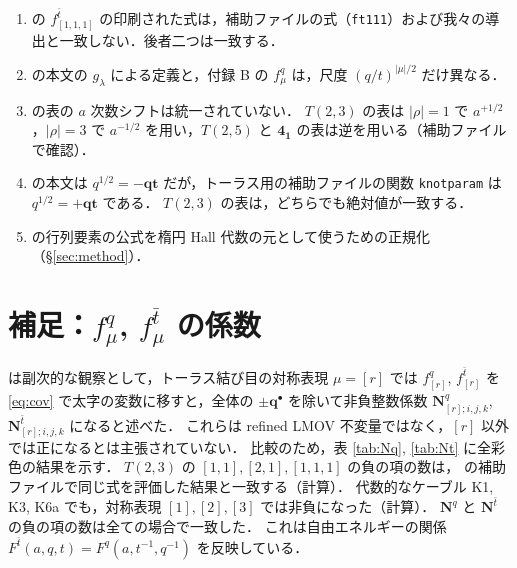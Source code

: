 \documentclass[11pt,a4paper]{ltjsarticle}
\theoremstyle{definition}
\theoremstyle{remark}
\newcommand{\bq}{\mathbf{q}}
\newcommand{\bt}{\mathbf{t}}
\begin{document}
\begin{enumerate}
\item \cite[付録 B]{KN} の $f^{\bar t}_{[1,1,1]}$ の印刷された式は，補助ファイルの式（\texttt{ft111}）および我々の導出と一致しない．後者二つは一致する．
\item \cite{KN} の本文の $g_\lambda$ による定義と，付録 B の $f^q_\mu$ は，尺度 $(q/t)^{|\mu|/2}$ だけ異なる．
\item \cite[付録 C]{KN} の表の $a$ 次数シフトは統一されていない．
  $T(2,3)$ の表は $|\rho|=1$ で $a^{+1/2}$，$|\rho|=3$ で $a^{-1/2}$ を用い，$T(2,5)$ と $\mathbf{4_1}$ の表は逆を用いる（補助ファイルで確認）．
\item \cite{KN} の本文は $q^{1/2}=-\bq\bt$ だが，トーラス用の補助ファイルの関数 \texttt{knotparam} は $q^{1/2}=+\bq\bt$ である．
  $T(2,3)$ の表は，どちらでも絶対値が一致する．
\item \cite[\S4]{GN} の行列要素の公式を楕円 Hall 代数の元として使うための正規化（\S\ref{sec:method}）．
\end{enumerate}

\section{補足：$f^q_\mu$, $f^{\bar t}_\mu$ の係数}\label{app:fqft}

\cite[\S4]{KN} は副次的な観察として，トーラス結び目の対称表現 $\mu=[r]$ では
$f^q_{[r]}$, $f^{\bar t}_{[r]}$ を \eqref{eq:cov} で太字の変数に移すと，全体の $\pm\bq^\bullet$ を除いて非負整数係数 $\mathbf{N}^q_{[r];i,j,k}$, $\mathbf{N}^{\bar t}_{[r];i,j,k}$ になると述べた．
これらは refined LMOV 不変量ではなく，$[r]$ 以外では正になるとは主張されていない．
比較のため，表 \ref{tab:Nq}, \ref{tab:Nt} に全彩色の結果を示す．
$T(2,3)$ の $[1,1],[2,1],[1,1,1]$ の負の項の数は，\cite{KN} の補助ファイルで同じ式を評価した結果と一致する（計算）．
代数的なケーブル K1, K3, K6a でも，対称表現 $[1],[2],[3]$ では非負になった（計算）．
$\mathbf{N}^q$ と $\mathbf{N}^{\bar t}$ の負の項の数は全ての場合で一致した．
これは自由エネルギーの関係 $F^{\bar t}(a,q,t)=F^q(a,t^{-1},q^{-1})$ \cite{KN} を反映している．

\begin{table}[h]
\centering
\caption{$\mathbf{N}^q_{\mu;i,j,k}$（$f^q_\mu$ の係数）．refined LMOV 不変量ではない．記号は表 \ref{tab:bps} と同じ．}\label{tab:Nq}

\end{table}

\begin{table}[h]
\centering
\caption{$\mathbf{N}^{\bar t}_{\mu;i,j,k}$（$f^{\bar t}_\mu$ の係数）．refined LMOV 不変量ではない．}\label{tab:Nt}

\end{table}
\end{document}
